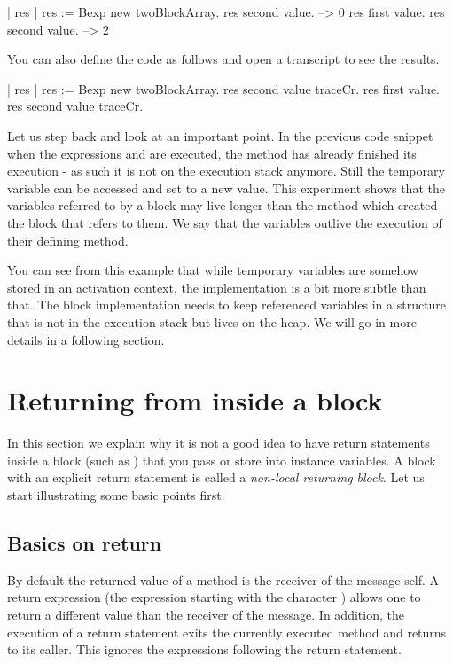 \documentclass[a4paper,10pt,twoside]{book}
\begin{document}
\begin{code}{}
| res |
res := Bexp new twoBlockArray.
res second value. --> 0
res first value.
res second value. --> 2
\end{code}

You can also define the code as follows and open a transcript to see the results.

\begin{code}{}
| res |
res := Bexp new twoBlockArray.
res second value traceCr.
res first value.
res second value traceCr.
\end{code}

Let us step back and look at an important point.
In the previous code snippet when the expressions  and  are executed, the method  has already finished its execution - as such it is not on the execution stack anymore.  Still the temporary variable  can be accessed and set to a new value. This experiment shows that the variables referred to by a block may live longer than the method which created the block that refers to them. We say that the variables outlive the execution of their defining method.

 You can see from this example that while temporary variables are somehow stored in an activation context, the implementation is a bit more subtle than that. The block implementation needs to keep referenced variables in a structure that is not in the execution stack but lives on the heap. We will go in more details in a following section.


\section{Returning from inside a block}
In this section we explain why it is  not a good idea to have return statements inside a block (such as \ct{[^ 33]}) that you pass or store into instance variables. A block with an explicit return statement is called a \emph{non-local returning block}. Let us start illustrating some basic points first.

\subsection{Basics on return}

By default the returned value of a method is the receiver of the message \ie self.
A return expression (the expression starting with the character \ct{^}) allows one to return a different value than the receiver of the message. In addition, the execution of a return statement exits the currently executed method and returns to its caller. This ignores the expressions following the return statement.
\end{document}
